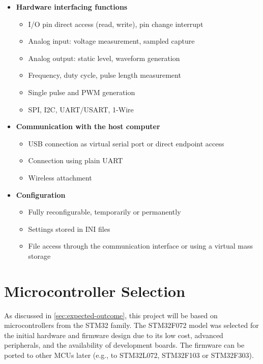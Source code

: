 \begin{itemize}
	\item \textbf{Hardware interfacing functions}
		\begin{itemize}
			\item I/O pin direct access (read, write), pin change interrupt
			\item Analog input: voltage measurement, sampled capture
			\item Analog output: static level, waveform generation
			\item Frequency, duty cycle, pulse length measurement
			\item Single pulse and \gls{PWM} generation
			\item \gls{SPI}, \gls{I2C}, \gls{UART}/\gls{USART}, 1-Wire
		\end{itemize}
	\pagebreak[0]
	\item \textbf{Communication with the host computer}
		\begin{itemize}
			\item \gls{USB} connection as virtual serial port or direct endpoint access
			\item Connection using plain \gls{UART}
			\item Wireless attachment
		\end{itemize}
	\item \textbf{Configuration}
		\begin{itemize}
			\item Fully reconfigurable, temporarily or permanently
			\item Settings stored in INI files
			\item File access through the communication interface or using a virtual mass storage
		\end{itemize}
\end{itemize}

\section{Microcontroller Selection}

As discussed in \cref{sec:expected-outcome}, this project will be based on microcontrollers from the STM32 family. The STM32F072 model was selected for the initial hardware and firmware design due to its low cost, advanced peripherals, and the availability of development boards. The firmware can be ported to other \glspl{MCU} later (e.g., to STM32L072, STM32F103 or STM32F303).

